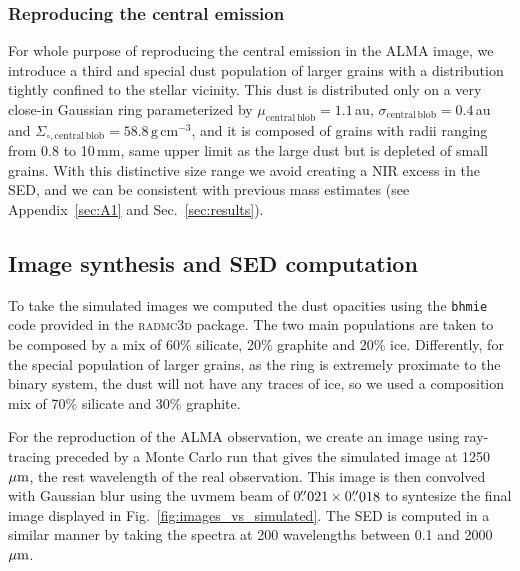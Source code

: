 \documentclass[fleqn,usenatbib,useAMS]{mnras}
\begin{document}
\subsubsection{Reproducing the central emission}
For whole purpose of reproducing the central emission in the ALMA image, we introduce a third and special dust population of larger grains with a distribution tightly confined to the stellar vicinity. This dust is distributed only on a very close-in Gaussian ring parameterized by $\mu_{\mathrm{central\,blob}}=1.1$\,au, $\sigma_{\mathrm{central\,blob}}=0.4$\,au and $\Sigma_{\circ,\mathrm{central\,blob}}=58.8\,\mathrm{g\,cm^{-3}}$, and it is composed of grains with radii ranging from 0.8 to 10\,mm, same upper limit as the large dust but is depleted of small grains. With this distinctive size range we avoid creating a NIR excess in the SED, and we can be consistent with previous mass estimates (see Appendix~\ref{sec:A1} and Sec.~\ref{sec:results}). 

\subsection{Image synthesis and SED computation}

To take the simulated images we computed the dust opacities using the {\tt bhmie} code provided in the \textsc{radmc3d} package. The two main populations are taken to be composed by a mix of 60\% silicate, 20\% graphite and 20\% ice. Differently, for the special population of larger grains, as the ring is extremely proximate to the binary system, the dust will not have any traces of ice, so we used a composition mix of 70\% silicate and 30\% graphite.

For the reproduction of the ALMA observation, we create an image using ray-tracing preceded by a Monte Carlo run that gives the simulated image at 1250\,$\hbox{$\mu$m}$, the rest wavelength of the real observation. This image is then convolved with Gaussian blur using the uvmem beam of 0$\hbox{$.\!\!^{\prime\prime}$}021 \, \times \, $0$\hbox{$.\!\!^{\prime\prime}$}018$ to syntesize the final image displayed in Fig.~\ref{fig:images_vs_simulated}. The SED is computed in a similar manner by taking the spectra at 200 wavelengths between 0.1 and 2000\,$\hbox{$\mu$m}$. 
\end{document}

